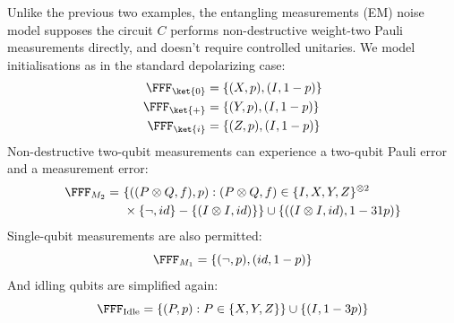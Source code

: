 \begin{example}
    Unlike the previous two examples, the entangling measurements (EM) noise model supposes the circuit $C$ performs non-destructive weight-two Pauli measurements directly, and doesn't require controlled unitaries.
    We model initialisations as in the standard depolarizing case:
    \begin{equation}
        \begin{aligned}
            \FFF_{\ket{0}} &= \{(X, p), (I, 1-p)\}\\
            \FFF_{\ket{+}} &= \{(Y, p), (I, 1-p)\}\\
            \FFF_{\ket{i}} &= \{(Z, p), (I, 1-p)\}
        \end{aligned}
    \end{equation}
    Non-destructive two-qubit measurements can experience a two-qubit Pauli error and a measurement error:
    \begin{equation}
        \begin{aligned}
            \FFF_{M_2}
            =\ &\{((P \otimes Q, f), p) : (P \otimes Q, f) \in \{I, X, Y, Z\}^{\otimes 2} \\
            &\times \{\neg, id\} - \{(I \otimes I, id)\}\} \cup \{((I \otimes I, id), 1 - 31p)\}
        \end{aligned}
    \end{equation}
    Single-qubit measurements are also permitted:
    \begin{equation}
        \FFF_{M_1} = \{(\neg, p), (id, 1-p)\}
    \end{equation}
    And idling qubits are simplified again:
    \begin{equation}
        \FFF_{\text{Idle}} = \{(P, p) : P \in \{X, Y, Z\}\} \cup \{(I, 1 - 3p)\}
    \end{equation}
\end{example}

